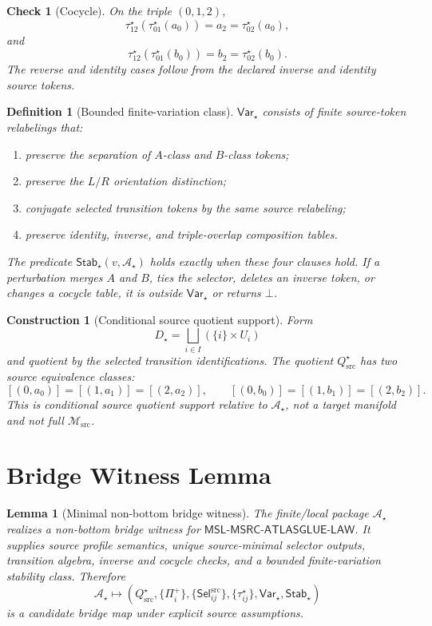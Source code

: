 \documentclass[11pt]{article}
\newcommand{\Msrc}{\mathcal{M}_{\mathrm{src}}}
\newcommand{\MSL}{\mathsf{MSL}\mbox{-}\mathsf{MSRC}\mbox{-}\mathsf{ATLASGLUE}\mbox{-}\mathsf{LAW}}
\newcommand{\Prof}{\Pi^{+}}
\newcommand{\Sel}{\mathsf{Sel}^{\mathrm{src}}}
\newcommand{\Qstar}{Q_{\mathrm{src}}^{\star}}
\newcommand{\Bot}{\bot}
\newcommand{\Astar}{\mathcal A_{\star}}
\newcommand{\Varstar}{\mathsf{Var}_{\star}}
\newcommand{\Stabstar}{\mathsf{Stab}_{\star}}
\newtheorem{definition}{Definition}
\newtheorem{construction}{Construction}
\newtheorem{lemma}{Lemma}
\newtheorem{checkresult}{Check}
\begin{document}
\begin{checkresult}[Cocycle]
On the triple \((0,1,2)\),
\[
  \tau_{12}^{\star}(\tau_{01}^{\star}(a_0))=a_2
  =\tau_{02}^{\star}(a_0),
\]
and
\[
  \tau_{12}^{\star}(\tau_{01}^{\star}(b_0))=b_2
  =\tau_{02}^{\star}(b_0).
\]
The reverse and identity cases follow from the declared inverse and identity
source tokens.
\end{checkresult}

\begin{definition}[Bounded finite-variation class]
\(\Varstar\) consists of finite source-token relabelings that:
\begin{enumerate}
  \item preserve the separation of \(A\)-class and \(B\)-class tokens;
  \item preserve the \(L/R\) orientation distinction;
  \item conjugate selected transition tokens by the same source relabeling;
  \item preserve identity, inverse, and triple-overlap composition tables.
\end{enumerate}
The predicate \(\Stabstar(v,\Astar)\) holds exactly when these four clauses
hold. If a perturbation merges \(A\) and \(B\), ties the selector, deletes an
inverse token, or changes a cocycle table, it is outside \(\Varstar\) or
returns \(\Bot\).
\end{definition}

\begin{construction}[Conditional source quotient support]
Form
\[
  D_{\star}=\bigsqcup_{i\in I}(\{i\}\times U_i)
\]
and quotient by the selected transition identifications. The quotient
\(\Qstar\) has two source equivalence classes:
\[
[(0,a_0)]=[(1,a_1)]=[(2,a_2)],
\qquad
[(0,b_0)]=[(1,b_1)]=[(2,b_2)].
\]
This is conditional source quotient support relative to \(\Astar\), not a
target manifold and not full \(\Msrc\).
\end{construction}

\section{Bridge Witness Lemma}

\begin{lemma}[Minimal non-bottom bridge witness]
The finite/local package \(\Astar\) realizes a non-bottom bridge witness for
\(\MSL\). It supplies source profile semantics, unique source-minimal
selector outputs, transition algebra, inverse and cocycle checks, and a
bounded finite-variation stability class. Therefore
\[
  \Astar \longmapsto
  (\Qstar,\{\Prof_i\},\{\Sel_{ij}\},\{\tau_{ij}^{\star}\},\Varstar,\Stabstar)
\]
is a candidate bridge map under explicit source assumptions.
\end{lemma}
\end{document}
